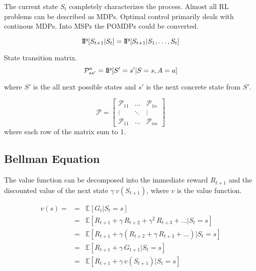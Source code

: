 The current state $S_t$ completely characterizes the process. %
Almost all RL problems can be described as MDPs.
Optimal control primarily deals with continous MDPs.
Into MSPs the POMDPs could be converted.

\[
    \text{I\kern-0.15em P}[S_{t+1}|S_t]=\text{I\kern-0.15em P}[S_{t+1}|S_1,\ldots,S_t]
\]

State transition matrix.
\[
    \mathcal{P}_{ss'}^a=\text{I\kern-0.15em P}[S'=s'|S=s,A=a]
\]

where $S'$ is the all next possible states and $s'$ is the next concrete state from $S'$.

\[
    \mathcal{P} = \begin{bmatrix}
                      \mathcal{P}_{11} & \dots  & \mathcal{P}_{1n} \\
                      \vdots           & \ddots & \vdots           \\
                      \mathcal{P}_{11} & \dots  & \mathcal{P}_{nn}
    \end{bmatrix}
\]
where each row of the matrix sum to 1.

\subsection{Bellman Equation}\label{subsec:bellman-equation}
The value function can be decomposed into the immediate reward $R_{t+1}$
and the discounted value of the next state $\gamma\ v(S_{t+1})$,
where $v$ is the value function.

\begin{eqnarray*}
    v(s) = &=& \mathbb{E}[G_{t}|S_t=s]\\
    &=& \mathbb{E}[R_{t+1} + \gamma\,R_{t+2}+\gamma^2\,R_{t+3}+\ldots|S_t=s]\\
    &=& \mathbb{E}[R_{t+1} + \gamma(R_{t+2}+\gamma\,R_{t+3}+\ldots)|S_t=s]\\
    &=& \mathbb{E}[R_{t+1} + \gamma\,G_{t+1}|S_t=s]\\
    &=& \mathbb{E}[R_{t+1} + \gamma\,v(S_{t+1})|S_t=s]
\end{eqnarray*}

\begin{center}
\end{center}

